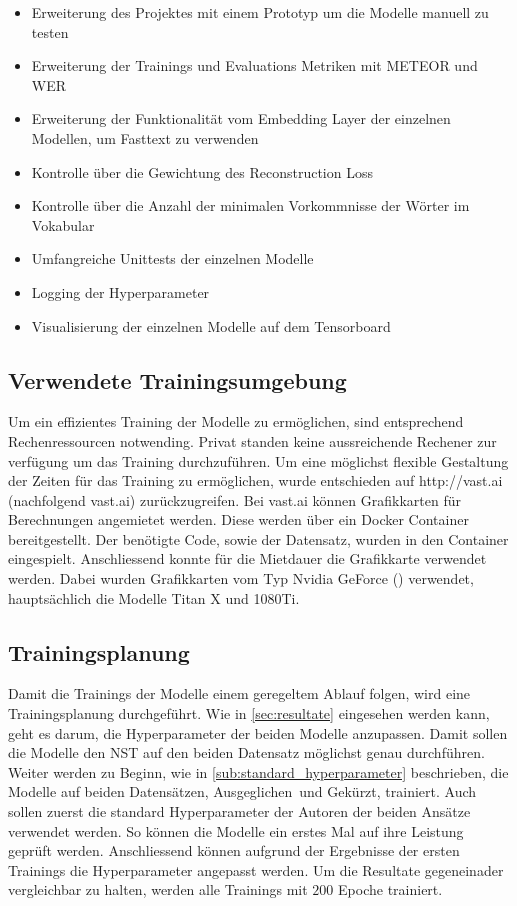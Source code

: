 \begin{itemize}
  \setlength\itemsep{0em}
  \item Erweiterung des Projektes mit einem Prototyp um die Modelle manuell zu testen
  \item Erweiterung der Trainings und Evaluations Metriken mit \gls{METEOR} und \gls{WER}
  \item Erweiterung der Funktionalität vom Embedding Layer der einzelnen Modellen, um Fasttext zu verwenden
  \item Kontrolle über die Gewichtung des Reconstruction Loss
  \item Kontrolle über die Anzahl der minimalen Vorkommnisse der Wörter im Vokabular
  \item Umfangreiche Unittests der einzelnen Modelle
  \item Logging der Hyperparameter
  \item Visualisierung der einzelnen Modelle auf dem Tensorboard
\end{itemize}
\noindent

\subsection{Verwendete Trainingsumgebung}
\label{sub:verwendete_trainingsumgebung}
Um ein effizientes Training der Modelle zu ermöglichen, sind entsprechend Rechenressourcen notwending. Privat standen
keine aussreichende Rechener zur verfügung um das Training durchzuführen. Um eine möglichst flexible Gestaltung der
Zeiten für das Training zu ermöglichen, wurde entschieden auf http://vast.ai (nachfolgend vast.ai) zurückzugreifen. Bei
vast.ai können Grafikkarten für Berechnungen angemietet werden. Diese werden über ein Docker Container bereitgestellt.
Der benötigte Code, sowie der Datensatz, wurden in den Container eingespielt. Anschliessend konnte für die Mietdauer die
Grafikkarte verwendet werden. Dabei wurden Grafikkarten vom Typ Nvidia GeForce (\cite{wikipedia_2019_geforce}) verwendet, hauptsächlich die Modelle
Titan X und 1080Ti.

\subsection{Trainingsplanung}
\label{sub:ablauf_und_resultate}
Damit die Trainings der Modelle einem geregeltem Ablauf folgen, wird eine Trainingsplanung durchgeführt. Wie in
\ref{sec:resultate} eingesehen werden kann, geht es darum, die Hyperparameter der beiden Modelle anzupassen. Damit
sollen die Modelle den \gls{NST} auf den beiden Datensatz möglichst genau durchführen. Weiter werden zu Beginn, wie in
\ref{sub:standard_hyperparameter} beschrieben, die Modelle auf beiden Datensätzen, \flqq Ausgeglichen\frqq \ und \flqq Gekürzt\frqq,
trainiert. Auch sollen zuerst die standard Hyperparameter der Autoren der beiden Ansätze verwendet werden. So können die
Modelle ein erstes Mal auf ihre Leistung geprüft werden. Anschliessend können aufgrund der Ergebnisse der ersten
Trainings die Hyperparameter angepasst werden. Um die Resultate gegeneinader vergleichbar zu halten, werden alle
Trainings mit $ 200 $ \gls{Epoche} trainiert.

